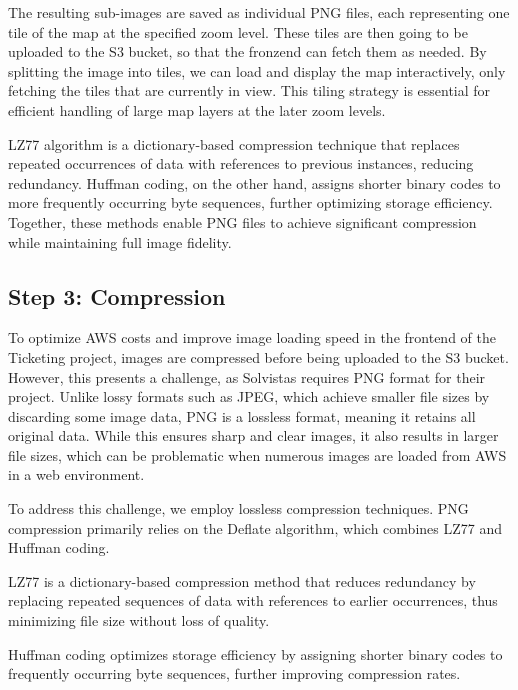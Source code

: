 The resulting sub-images are saved as individual PNG files, each representing one tile of the map at the specified zoom level. These tiles are then going to be uploaded to the S3 bucket, so that the fronzend can fetch them as needed. By splitting the image into tiles, we can load and display the map interactively, only fetching the tiles that are currently in view. This tiling strategy is essential for efficient handling of large map layers at the later zoom levels.

LZ77 algorithm is a dictionary-based compression technique that replaces repeated occurrences of data with references to previous instances, reducing redundancy. Huffman coding, on the other hand, assigns shorter binary codes to more frequently occurring byte sequences, further optimizing storage efficiency. Together, these methods enable PNG files to achieve significant compression while maintaining full image fidelity.

\subsection{Step 3: Compression}

To optimize AWS costs and improve image loading speed in the frontend of the Ticketing project, images are compressed before being uploaded to the S3 bucket. However, this presents a challenge, as Solvistas requires PNG format for their project. Unlike lossy formats such as JPEG, which achieve smaller file sizes by discarding some image data, PNG is a lossless format, meaning it retains all original data. While this ensures sharp and clear images, it also results in larger file sizes, which can be problematic when numerous images are loaded from AWS in a web environment.

To address this challenge, we employ lossless compression techniques. PNG compression primarily relies on the Deflate algorithm, which combines LZ77 and Huffman coding.

\begin{compactitem}
\item{}LZ77 is a dictionary-based compression method that reduces redundancy by replacing repeated sequences of data with references to earlier occurrences, thus minimizing file size without loss of quality.
\item{}Huffman coding optimizes storage efficiency by assigning shorter binary codes to frequently occurring byte sequences, further improving compression rates.
\end{compactitem}

